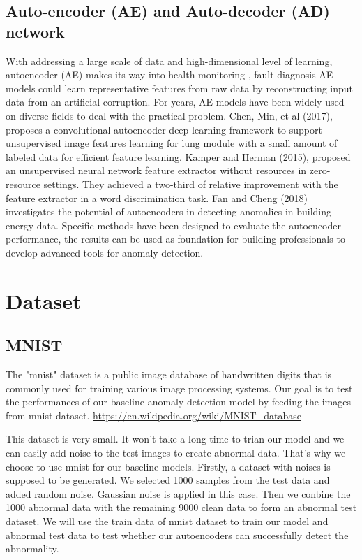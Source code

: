 \documentclass{article}
\begin{document}
\subsection{Auto-encoder (AE) and Auto-decoder (AD) network}
With addressing a large scale of data and high-dimensional level of learning, autoencoder (AE) makes its way into health monitoring \cite{AuthorRZ}, fault diagnosis AE models could learn representative features from raw data by reconstructing input data from an artificial corruption. For years, AE models have been widely used on diverse fields to deal with the practical problem. Chen, Min, et al (2017), proposes a convolutional autoencoder deep learning framework to support unsupervised image
features learning for lung module with a small amount of labeled data for efficient feature learning. Kamper and Herman (2015), proposed an unsupervised neural network feature extractor without resources in zero-resource settings. They achieved a two-third of relative improvement with the feature extractor in a word discrimination task. \cite{AuthorKa} Fan and Cheng (2018) investigates the potential of autoencoders in detecting anomalies in building energy data. Specific methods have been
designed to evaluate the autoencoder performance, the results can be used as foundation for building professionals to develop advanced tools for anomaly detection. 

\section{Dataset}
\subsection{MNIST}
The "mnist" dataset is a public image database of handwritten digits that is commonly used for training various image processing systems. Our goal is to test the performances of our baseline anomaly detection model by feeding the images from mnist dataset.
\url{https://en.wikipedia.org/wiki/MNIST_database}

This dataset is very small. It won't take a long time to trian our model and we can easily add noise to the test images to create abnormal data. That's why we choose to use mnist for our baseline models. Firstly, a dataset with noises is supposed to be generated. We selected 1000 samples from the test data and added random noise. Gaussian noise is applied in this case. Then we conbine the 1000 abnormal data with the remaining 9000 clean data to form an abnormal test dataset. We will use the
train data of mnist dataset to train our model and abnormal test data to test whether our autoencoders can successfully detect the abnormality.
\end{document}
